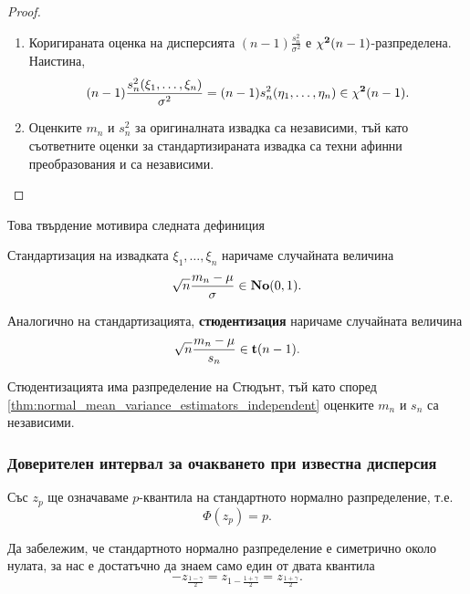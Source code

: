 \documentclass{../../common/topic}
\begin{document}
\begin{proof}
\begin{enumerate}
    \item Коригираната оценка на дисперсията \( (n-1) \frac {s_n^2} {\sigma^2} \) е \( \operatorname{\mathbf{\chi^2}}(n-1) \)-разпределена. Наистина,
    \begin{equation*}
      (n-1) \frac {s_n^2(\xi_1, \ldots, \xi_n)} {\sigma^2}
      =
      (n-1) s_n^2(\eta_1, \ldots, \eta_n)
      \in
      \operatorname{\mathbf{\chi^2}}(n - 1).
    \end{equation*}

    \item Оценките \( m_n \) и \( s_n^2 \) за оригиналната извадка са независими, тъй като съответните оценки за стандартизираната извадка са техни афинни преобразования и са независими.
  \end{enumerate}
\end{proof}

Това твърдение мотивира следната дефиниция
\begin{definition}
  Стандартизация на извадката \( \xi_1, \ldots, \xi_n \) наричаме случайната величина
  \begin{equation*}
    \sqrt n \frac {m_n - \mu} \sigma \in \operatorname{\mathbf{No}}(0, 1).
  \end{equation*}

  Аналогично на стандартизацията, \textbf{стюдентизация} наричаме случайната величина
  \begin{equation*}
    \sqrt n \frac {m_n - \mu} {s_n} \in \operatorname{\mathbf{t}}(n - 1).
  \end{equation*}
\end{definition}

\begin{remark}
  Стюдентизацията има разпределение на Стюдънт, тъй като според \cref{thm:normal_mean_variance_estimators_independent} оценките \( m_n \) и \( s_n \) са независими.
\end{remark}

\subsubsection{Доверителен интервал за очакването при известна дисперсия}

Със \( z_p \) ще означаваме \( p \)-квантила на стандартното нормално разпределение, т.е.
\begin{equation*}
  \Phi(z_p) = p.
\end{equation*}

Да забележим, че стандартното нормално разпределение е симетрично около нулата, за нас е достатъчно да знаем само един от двата квантила
\begin{equation*}
  -z_{\frac {1-\gamma} 2}
  =
  z_{1-\frac {1+\gamma} 2}
  =
  z_{\frac {1+\gamma} 2}.
\end{equation*}
\end{document}
